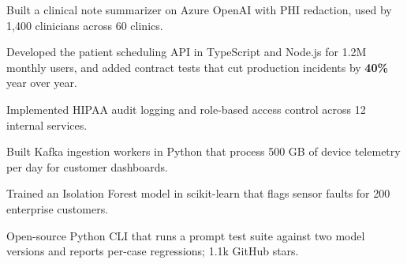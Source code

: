 \begin{highlights}
  \item Built a clinical note summarizer on Azure OpenAI with PHI redaction, used by
    1,400 clinicians across 60 clinics.
  \item Developed the patient scheduling API in TypeScript and Node.js for 1.2M
    monthly users, and added contract tests that cut production incidents by
    \textbf{40\%} year over year.
  \item Implemented HIPAA audit logging and role-based access control across
    12 internal services.
\end{highlights}

\begin{highlights}
  \item Built Kafka ingestion workers in Python that process 500 GB of device
    telemetry per day for customer dashboards.
  \item Trained an Isolation Forest model in scikit-learn that flags sensor faults
    for 200 enterprise customers.
\end{highlights}

\begin{highlights}
  \item Open-source Python CLI that runs a prompt test suite against two model
    versions and reports per-case regressions; 1.1k GitHub stars.
\end{highlights}



